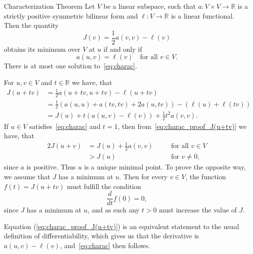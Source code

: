 
\begin{thmx}{Characterization Theorem}
    Let $V$ be a linear subspace, such that
        \(
            a: V \times V \rightarrow \mathbb{R}
        \) 
    is a strictly positive symmetric bilinear form
     and
        \(
            \ell: V \rightarrow \mathbb{R}
        \)
    is a linear functional. Then the quantity
        \[
            J(v)=\frac{1}{2} a(v,v) - \ell(v)
        \]
    obtains its minimum over $V$ at $u$ if and only if
        \begin{equation}
            a(u,v) = \ell(v) \quad \text{for all } v \in V.
        \label{eq:charac}
        \end{equation}
    There is at most one solution to~\eqref{eq:charac}.\label{thm:charac_theorem}
\end{thmx}

\begin{bev}
    For $u,v \in V$ and $t \in \mathbb{R}$ we have, that
    \begin{align}
        J(u+tv) &= \frac{1}{2} a(u+tv,u+tv) - \ell(u+tv) \nonumber \\
        &= \frac{1}{2} \left( a(u,u) + a(tv,tv) + 2a(u,tv) \right) - \left(  \ell(u) + \ell(tv)\right) \nonumber \\
        &= J(u) + t\left( a(u,v) - \ell(v) \right) + \frac{1}{2}t^2a(v,v). \label{eq:charac_proof_J(u+tv)}
    \end{align}
    If $u \in V$ satisfies~\eqref{eq:charac} and $t=1$, then from~\eqref{eq:charac_proof_J(u+tv)} we have, that
    \begin{alignat}{2}
        J(u+v) &= J(u) + \frac{1}{2}a(v,v) \quad &&\text{for all } v\in V  \nonumber \\
        &> J(u) \quad &&\text{for } v \neq 0,
    \end{alignat}
    since $a$ is positive.
    Thus $u$ is a unique minimal point. 
    To prove the opposite way, we assume that $J$ has a minimum at $u$.
    Then for every $v\in V$, the function $f(t)= J(u+tv)$ must fulfill the condition
    \begin{equation*}
        \frac{d}{dt}f(0) = 0,
    \end{equation*}
    since $J$ has a minimum at $u$, and as such any $t>0$ must increase the 
    value of $J$.
    \iffalse
    This derivative can be found using little-o notation.
    \begin{align*}
          f(t+h) = J(u+(t+h)v) &= J(u) + (t+h) (a(u,v) - \ell(v)) + \frac{1}{2}{(t+h)}^2 a(v,v) \\
          &= J(u+tv) + h(a(u,v) - \ell(v)) + \frac{1}{2}((h^2+2th)a(v,v)).
    \end{align*}
    \fi
    Equation (\ref{eq:charac_proof_J(u+tv)}) is an equivalent statement to 
    the usual definition of differentiability, which gives us that 
     the derivative is $a(u,v) - \ell(v)$, and~\eqref{eq:charac} then follows.
\end{bev}
